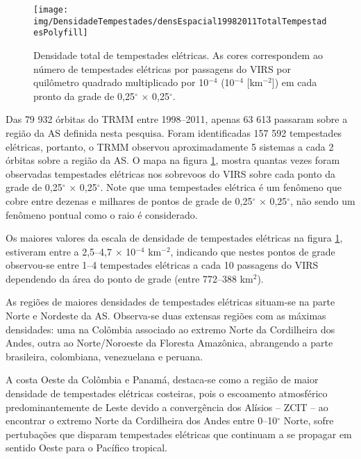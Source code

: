 \begin{figure}[!hb]
 \centering
 {\texttt{[image: img/DensidadeTempestades/densEspacial19982011TotalTempestadesPolyfill]}}
\caption{Densidade total de tempestades elétricas. As cores correspondem ao número de tempestades elétricas por passagens do VIRS por quilômetro quadrado multiplicado por 10$^{-4}$ (10$^{-4}$ [km$^{-2}$]) em cada pronto da grade de 0,25$^{\circ}$ $\times$ 0,25$^{\circ}$. }
 \label{densidadeTempestade}
\end{figure}


Das {79 932} órbitas do TRMM entre 1998--2011, apenas {63 613} passaram sobre a região da AS definida nesta pesquisa. Foram identificadas {157 592} tempestades elétricas, portanto, o TRMM observou aproximadamente 5 sistemas a cada 2 órbitas sobre a região da AS. O mapa na figura \ref{densidadeTempestade}, mostra quantas vezes foram observadas tempestades elétricas nos sobrevoos do VIRS sobre cada ponto da grade de 0,25$^{\circ}$ $\times$ 0,25$^{\circ}$. Note que uma tempestades elétrica é um fenômeno que cobre entre dezenas e milhares de pontos de grade de 0,25$^{\circ}$ $\times$ 0,25$^{\circ}$, não sendo um fenômeno pontual como o raio é considerado.

Os maiores valores da escala de densidade de tempestades elétricas na figura \ref{densidadeTempestade}, estiveram entre a 2,5--4,7 $\times$ 10$^{-4}$ km$^{-2}$, indicando que nestes pontos de grade observou-se entre 1--4 tempestades elétricas a cada 10 passagens do VIRS dependendo da área do ponto de grade (entre 772--388 km$^2$).  

As regiões de maiores densidades de tempestades elétricas situam-se na parte Norte e Nordeste da AS. Observa-se duas extensas regiões com as máximas densidades: uma na Colômbia associado ao extremo Norte da Cordilheira dos Andes, outra ao Norte/Noroeste da Floresta Amazônica, abrangendo a parte brasileira, colombiana, venezuelana e peruana.  

A costa Oeste da Colômbia e Panamá, destaca-se como a região de maior densidade de tempestades elétricas costeiras, pois o escoamento atmosférico predominantemente de Leste devido a convergência dos Alísios -- ZCIT -- ao encontrar o extremo Norte da Cordilheira dos Andes entre 0--10$^{\circ}$ Norte, sofre pertubações que disparam tempestades elétricas que continuam a se propagar em sentido Oeste para o Pacífico tropical.  

